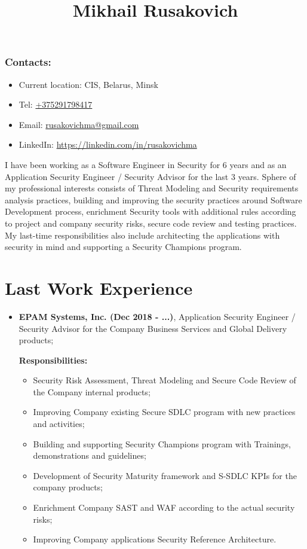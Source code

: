 \documentclass[a4paper, 12pt]{article}
\title{Mikhail Rusakovich}
\author{}
\date{}
\newcommand{\position}[1]{
    \textbf{#1}}
\begin{document}
\maketitle

\subsubsection*{Contacts:}
\begin{itemize}
	\item Current location: CIS, Belarus, Minsk
    \item Tel: \href{tel:+375291798417}{+375291798417}
    \item Email: \href{mailto:rusakovichma@gmail.com}{rusakovichma@gmail.com}
    \item LinkedIn: \href{https://linkedin.com/in/rusakovichma
}{https://linkedin.com/in/rusakovichma}
\end{itemize}

I have been working as a Software Engineer in Security for 6 years and as an Application Security Engineer / Security Advisor for the last 3 years. Sphere of my professional interests consists of Threat Modeling and Security requirements analysis practices, building and improving the security practices around Software Development process, enrichment Security tools with additional rules according to project and company security risks, secure code review and testing practices. My last-time responsibilities also include architecting the applications with security in mind and supporting a Security Champions program.

\section*{Last Work Experience}

    \begin{itemize}
        \item \position{EPAM Systems, Inc. (Dec 2018 - ...)}, Application Security Engineer / Security Advisor for the Company Business Services and Global Delivery products;

            \textbf{Responsibilities:}
			\begin{itemize}
  				\item Security Risk Assessment, Threat Modeling and Secure Code Review of the Company internal products;
  				\item Improving Company existing Secure SDLC program with new practices and activities; 
  				\item Building and supporting Security Champions program with Trainings, demonstrations and guidelines;
  				\item Development of Security Maturity framework and S-SDLC KPIs for the company products;
  				\item Enrichment Company SAST and WAF according to the actual security risks;

  				\item Improving Company applications Security Reference Architecture.
			\end{itemize}
    \end{itemize} 
            
\end{document}
